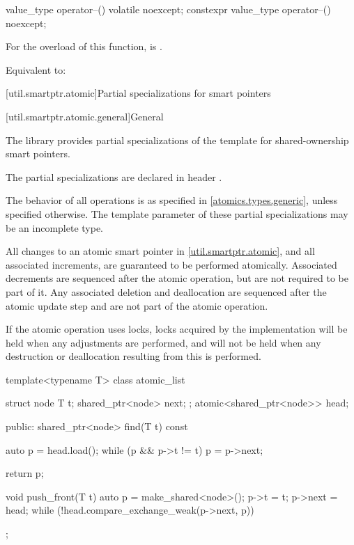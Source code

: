 %
%
\begin{itemdecl}
value_type operator--() volatile noexcept;
constexpr value_type operator--() noexcept;
\end{itemdecl}

\begin{itemdescr}
\pnum
\constraints
For the  overload of this function,
 is .

\pnum
\effects
Equivalent to: 
\end{itemdescr}

[util.smartptr.atomic]{Partial specializations for smart pointers}%
%

[util.smartptr.atomic.general]{General}

\pnum
The library provides partial specializations of the  template
for shared-ownership smart pointers.
\begin{note}
The partial specializations are declared in header .
\end{note}
The behavior of all operations is as specified in \ref{atomics.types.generic},
unless specified otherwise.
The template parameter  of these partial specializations
may be an incomplete type.

\pnum
All changes to an atomic smart pointer in \ref{util.smartptr.atomic}, and
all associated  increments,
are guaranteed to be performed atomically.
Associated  decrements
are sequenced after the atomic operation,
but are not required to be part of it.
Any associated deletion and deallocation
are sequenced after the atomic update step and
are not part of the atomic operation.
\begin{note}
If the atomic operation uses locks,
locks acquired by the implementation
will be held when any  adjustments are performed, and
will not be held when any destruction or deallocation
resulting from this is performed.
\end{note}

\pnum
\begin{example}
\begin{codeblock}
template<typename T> class atomic_list {
  struct node {
    T t;
    shared_ptr<node> next;
  };
  atomic<shared_ptr<node>> head;

public:
  shared_ptr<node> find(T t) const {
    auto p = head.load();
    while (p && p->t != t)
      p = p->next;

    return p;
  }

  void push_front(T t) {
    auto p = make_shared<node>();
    p->t = t;
    p->next = head;
    while (!head.compare_exchange_weak(p->next, p)) {}
  }
};
\end{codeblock}
\end{example}

